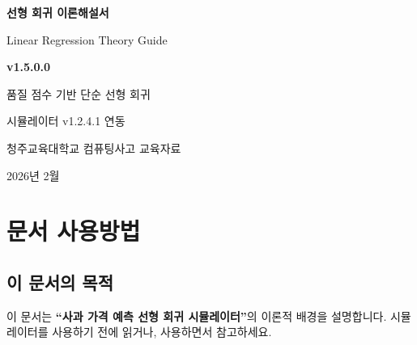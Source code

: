\documentclass[11pt,a4paper]{article}
\begin{document}
\renewcommand{\contentsname}{목차}

\thispagestyle{empty}
\begin{center}
\vspace*{3cm}

{\fontsize{72pt}{72pt}\selectfont {}}

\vspace{1cm}

{\fontsize{28pt}{32pt}\selectfont\bfseries\color{primary} 선형 회귀 이론해설서}

\vspace{0.5cm}

{\Large\color{lightbrown} Linear Regression Theory Guide}

\vspace{1.5cm}

\begin{tcolorbox}[colback=primary, colframe=primary, arc=15pt, width=4cm]
  \centering\large\bfseries\color{white} v1.5.0.0
\end{tcolorbox}

\vspace{1cm}

{\large 품질 점수 기반 단순 선형 회귀}

{\color{lightbrown} 시뮬레이터 v1.2.4.1 연동}

\vspace{3cm}

{\color{lightbrown} 청주교육대학교 컴퓨팅사고 교육자료}

{\color{lightbrown} 2026년 2월}

\end{center}

\newpage

\tableofcontents
\newpage

\section*{ 문서 사용방법}

\subsection*{이 문서의 목적}

이 문서는 \textbf{``사과 가격 예측 선형 회귀 시뮬레이터''}의 이론적 배경을 설명합니다. 시뮬레이터를 사용하기 전에 읽거나, 사용하면서 참고하세요.
\end{document}
